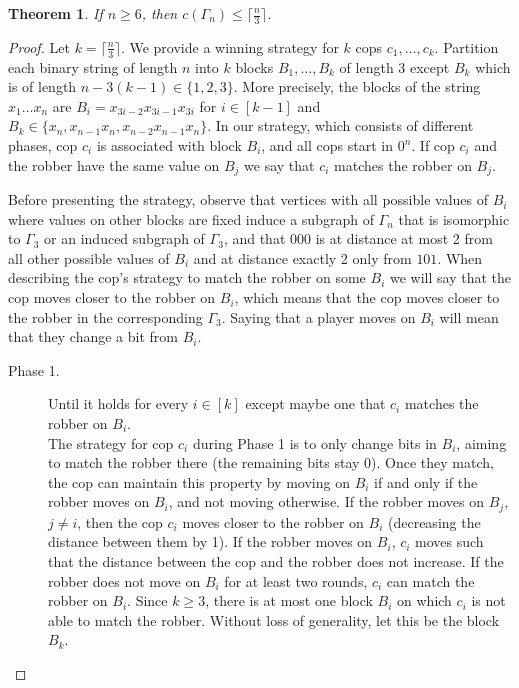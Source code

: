 \documentclass[11pt]{article}
\newtheorem{theorem}{Theorem}[section]
\begin{document}
\begin{theorem}
    \label{thm:n/3}
    If $n \geq 6$, then $c(\Gamma_n)\leq \lceil \frac{n}{3}\rceil$.
\end{theorem}

\begin{proof}
    Let $k=\lceil \frac{n}{3}\rceil$. We provide a winning strategy for $k$ cops $c_1, \ldots, c_k$. Partition each binary string of length $n$ into $k$ blocks $B_1, \ldots, B_k$ of length 3 except $B_k$ which is of length $n - 3(k-1) \in \{1,2,3\}$. More precisely, the blocks of the string $x_1 \ldots x_n$ are $B_i = x_{3i-2} x_{3i-1} x_{3i}$ for $i \in [k-1]$ and $B_k \in \{x_n, x_{n-1} x_n, x_{n-2} x_{n-1} x_n\}$. In our strategy, which consists of different phases, cop $c_i$ is associated with block $B_i$, and all cops start in $0^n$. If cop $c_i$ and the robber have the same value on $B_j$ we say that $c_i$ matches the robber on $B_j$.

    Before presenting the strategy, observe that vertices with all possible values of $B_i$ where values on other blocks are fixed induce a subgraph of $\Gamma_n$ that is isomorphic to $\Gamma_3$ or an induced subgraph of $\Gamma_3$, and that $000$ is at distance at most 2 from all other possible values of $B_i$ and at distance exactly 2 only from $101$. When describing the cop's strategy to match the robber on some $B_i$ we will say that the cop moves closer to the robber on $B_i$, which means that the cop moves closer to the robber in the corresponding $\Gamma_3$. Saying that a player moves on $B_i$ will mean that they change a bit from $B_i$.

    \begin{description}
        \item[Phase 1.] Until it holds for every $i \in [k]$ except maybe one that $c_i$ matches the robber on $B_i$.\\
        The strategy for cop $c_i$ during Phase 1 is to only change bits in $B_i$, aiming to match the robber there (the remaining bits stay $0$). Once they match, the cop can maintain this property by moving on $B_i$ if and only if the robber moves on $B_i$, and not moving otherwise. If the robber moves on $B_j$, $j \neq i$, then the cop $c_i$ moves closer to the robber on $B_i$ (decreasing the distance between them by 1). If the robber moves on $B_i$, $c_i$ moves such that the distance between the cop and the robber does not increase. If the robber does not move on $B_i$ for at least two rounds, $c_i$ can match the robber on $B_i$. Since $k \geq 3$, there is at most one block $B_i$ on which $c_i$ is not able to match the robber. Without loss of generality, let this be the block $B_k$.


\end{description}
\end{proof}
\end{document}
